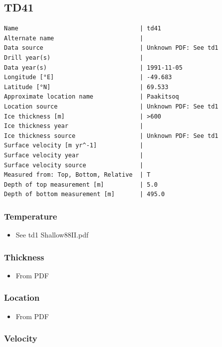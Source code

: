 \documentclass[article,a4paper,times,11pt,twoside]{article}
\begin{document}
\subsection{TD41}
\label{sec:org4034fca}
\begin{verbatim}
Name                                  | td41
Alternate name                        | 
Data source                           | Unknown PDF: See td1
Drill year(s)                         | 
Data year(s)                          | 1991-11-05
Longitude [°E]                        | -49.683
Latitude [°N]                         | 69.533
Approximate location name             | Paakitsoq
Location source                       | Unknown PDF: See td1
Ice thickness [m]                     | >600
Ice thickness year                    | 
Ice thickness source                  | Unknown PDF: See td1
Surface velocity [m yr^-1]            | 
Surface velocity year                 | 
Surface velocity source               | 
Measured from: Top, Bottom, Relative  | T
Depth of top measurement [m]          | 5.0
Depth of bottom measurement [m]       | 495.0
\end{verbatim}

\subsubsection{Temperature}
\label{sec:org806fc6f}

\begin{itemize}
\item See td1 Shallow88II.pdf
\end{itemize}

\subsubsection{Thickness}
\label{sec:orgeeccbe6}

\begin{itemize}
\item From PDF
\end{itemize}

\subsubsection{Location}
\label{sec:org9cbf802}

\begin{itemize}
\item From PDF
\end{itemize}

\subsubsection{Velocity}
\label{sec:org5a3cf4a}
\clearpage
\end{document}
